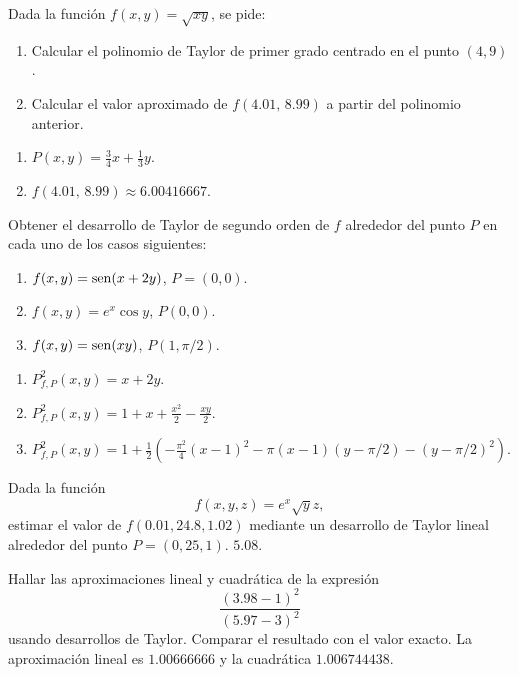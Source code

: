 
{Dada la función $f(x,y)=\sqrt{xy}$, se pide:
\begin{enumerate}
\item Calcular el polinomio de Taylor de primer grado centrado en el punto $(4,9)$.
\item Calcular el valor aproximado de $f(4.01,\,8.99)$ a partir del polinomio anterior. 
\end{enumerate}
}
{\begin{enumerate}
\item $P(x,y)= \frac{3}{4}x+\frac{1}{3}y$.
\item $f(4.01,\,8.99)\approx 6.00416667$.
\end{enumerate}
}
{
}


{Obtener el desarrollo de Taylor de segundo orden de $f$ alrededor del punto $P$ en cada uno de los casos siguientes:
\begin{enumerate}
\item $f(x,y)=\operatorname{sen}(x+2y)$, $P=(0,0)$.
\item $f(x,y)=e^x\cos y$, $P(0,0)$.
\item $f(x,y)=\operatorname{sen}(xy)$, $P(1,\pi/2)$.
\end{enumerate}
}
{\begin{enumerate}
\item $P^2_{f,P}(x,y)= x+2y$.
\item $P^2_{f,P}(x,y)= 1+x+\frac{x^2}{2}-\frac{xy}{2}$.
\item $P^2_{f,P}(x,y)= 1+\frac{1}{2}\left(-\frac{\pi^2}{4}(x-1)^2-\pi(x-1)(y-\pi/2)-(y-\pi/2)^2\right)$.
\end{enumerate}
}
{
}


{Dada la función 
\[
f(x,y,z)=e^x\sqrt{y}z,
\]
estimar el valor de $f(0.01,24.8,1.02)$ mediante un desarrollo de Taylor lineal alrededor del punto $P=(0,25,1)$.
}
{$5.08$.
}
{
}


{Hallar las aproximaciones lineal y cuadrática de la expresión
\[
\frac{(3.98-1)^2}{(5.97-3)^2}
\]
usando desarrollos de Taylor. Comparar el resultado con el valor exacto.
}
{La aproximación lineal es $1.00666666$ y la cuadrática $1.006744438$.
}
{
}
